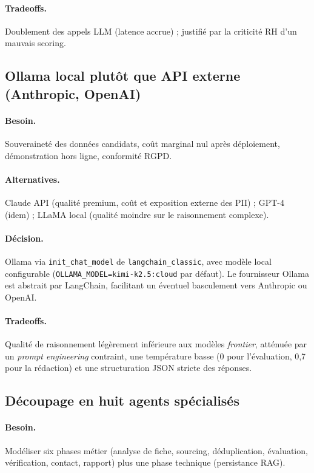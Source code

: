 \paragraph{Tradeoffs.} Doublement des appels LLM (latence accrue) ; justifié par la criticité RH d'un mauvais scoring.

\subsection{Ollama local plutôt que API externe (Anthropic, OpenAI)}

\paragraph{Besoin.} Souveraineté des données candidats, coût marginal nul après déploiement, démonstration hors ligne, conformité RGPD.

\paragraph{Alternatives.} Claude API (qualité premium, coût et exposition externe des PII) ; GPT-4 (idem) ; LLaMA local (qualité moindre sur le raisonnement complexe).

\paragraph{Décision.} Ollama via \texttt{init\_chat\_model} de \texttt{langchain\_classic}, avec modèle local configurable (\texttt{OLLAMA\_MODEL=kimi-k2.5:cloud} par défaut). Le fournisseur Ollama est abstrait par LangChain, facilitant un éventuel basculement vers Anthropic ou OpenAI.

\paragraph{Tradeoffs.} Qualité de raisonnement légèrement inférieure aux modèles \textit{frontier}, atténuée par un \textit{prompt engineering} contraint, une température basse (0 pour l'évaluation, 0,7 pour la rédaction) et une structuration JSON stricte des réponses.

\subsection{Découpage en huit agents spécialisés}

\paragraph{Besoin.} Modéliser six phases métier (analyse de fiche, sourcing, déduplication, évaluation, vérification, contact, rapport) plus une phase technique (persistance RAG).

